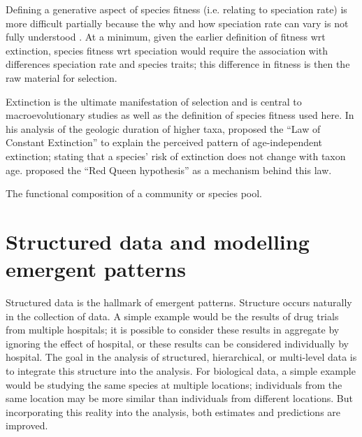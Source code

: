 Defining a generative aspect of species fitness (i.e. relating to speciation rate) is more difficult partially because the why and how speciation rate can vary is not fully understood \citep{Rabosky2015c,Rabosky2013e}. At a minimum, given the earlier definition of fitness wrt extinction, species fitness wrt speciation would require the association with differences speciation rate and species traits; this difference in fitness is then the raw material for selection.

Extinction is the ultimate manifestation of selection and is central to macroevolutionary studies as well as the definition of species fitness used here. In his analysis of the geologic duration of higher taxa, \citet{VanValen1973} proposed the ``Law of Constant Extinction'' to explain the perceived pattern of age-independent extinction; stating that a species' risk of extinction does not change with taxon age. \citet{VanValen1973} proposed the ``Red Queen hypothesis'' as a mechanism behind this law.

The functional composition of a community or species pool.



\section{Structured data and modelling emergent patterns}


Structured data is the hallmark of emergent patterns. Structure occurs naturally in the collection of data. A simple example would be the results of drug trials from multiple hospitals; it is possible to consider these results in aggregate by ignoring the effect of hospital, or these results can be considered individually by hospital. The goal in the analysis of structured, hierarchical, or multi-level data is to integrate this structure into the analysis. For biological data, a simple example would be studying the same species at multiple locations; individuals from the same location may be more similar than individuals from different locations. But incorporating this reality into the analysis, both estimates and predictions are improved.

